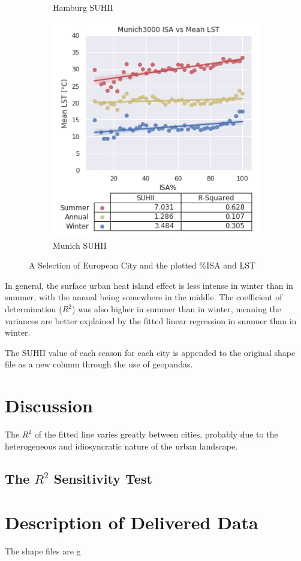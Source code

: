 \documentclass{article}
\begin{document}
\begin{figure}[!htb]
\begin{subfigure}{0.333\textwidth}
        \caption{Hamburg SUHII}
        \label{fig:subim2}
    \end{subfigure}\hfill
    \begin{subfigure}{0.333\textwidth}
        \centering
        \includegraphics[width=1\linewidth]{Munich3000.png}
        \caption{Munich SUHII}
        \label{fig:subim3}
    \end{subfigure}
    \caption{A Selection of European City and the plotted \%ISA and LST}
    \label{fig:my_label}
\end{figure}

In general, the surface urban heat island effect is less intense in winter than in summer, with the annual being somewhere in the middle. The coefficient of determination ($R^2$) was also higher in summer than in winter, meaning the variances are better explained by the fitted linear regression in summer than in winter.

The SUHII value of each season for each city is appended to the original shape file as a new column through the use of geopandas.

\section{Discussion}
The $R^2$ of the fitted line varies greatly between cities, probably due to the heterogeneous and idiosyncratic nature of the urban landscape.

\subsection{The $R^2$ Sensitivity Test}



\section{Description of Delivered Data}
The shape files are g

\medskip

\printbibliography
\end{document}
